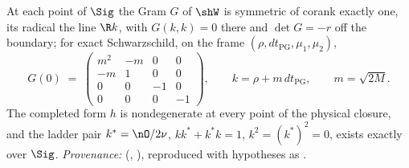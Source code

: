 At each point of $\Sig$ the Gram $G$ of $\shW$ is symmetric of corank exactly one, its radical the line $\R k$, with $G(k,k) = 0$ there and $\det G = -r$ off the boundary; for exact Schwarzschild, on the frame $(\rho, dt_{\mathrm{PG}}, \mu_1, \mu_2)$,
\[
G(0) \;=\; \begin{pmatrix} m^2 & -m & 0 & 0\\ -m & 1 & 0 & 0\\ 0 & 0 & -1 & 0\\ 0 & 0 & 0 & -1 \end{pmatrix}, \qquad k = \rho + m\,dt_{\mathrm{PG}}, \qquad m = \sqrt{2M}.
\]
The completed form $h$ is nondegenerate at every point of the physical closure, and the ladder pair $k^{*} = \nO/2\nu$, $kk^{*} + k^{*}k = 1$, $k^{2} = (k^{*})^{2} = 0$, exists exactly over $\Sig$. \emph{Provenance:} \cite[Thms 8.7, 8.12]{ButlerT4} (, ), reproduced with hypotheses as \cite[Facts B.1, B.2]{ButlerT5}.
